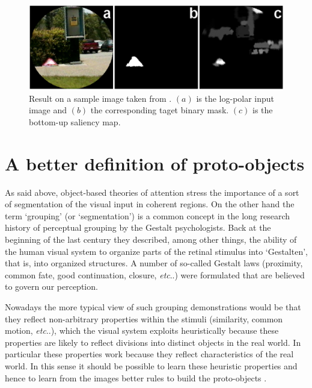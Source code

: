 \documentclass{llncs}
\makeatletter
\DeclareRobustCommand\onedot{\futurelet\@let@token\@onedot}
\def\@onedot{\ifx\@let@token.\else.\null\fi\xspace}
\def\etc{\emph{etc}\onedot} \def\vs{\emph{vs}\onedot}
\makeatother
\begin{document}
\begin{figure}[!h]
  \begin{center}
    \includegraphics[width=0.9\linewidth]{./figs/attention/itti_numbers}
    \caption{Result on a sample image taken from \cite{IttiK01b}.
     $(a)$ is the log-polar input image and $(b)$ the corresponding taget binary mask.
     $(c)$ is the bottom-up saliency map.}
    \label{fig:itti_ex}
  \end{center}
\end{figure}


\section{A better definition of proto-objects}
\label{sec:ass_fields}


As said above, object-based theories of attention stress the importance
of a sort of segmentation of the visual input in coherent regions.
On the other hand the term `grouping' (or `segmentation')
is a common concept in the long research history of perceptual grouping
by the Gestalt psychologists.
Back at the beginning of the last century they
described, among other things, the ability of the human
visual system to organize parts of the retinal stimulus
into `Gestalten', that is, into organized structures.
A number of so-called Gestalt laws 
(proximity, common fate, good continuation, closure, \etc) were
formulated that are believed to govern our perception.

Nowadays the more typical view of such grouping
demonstrations would be that they reflect non-arbitrary properties within the stimuli
(similarity, common motion, \etc), which the visual system
exploits heuristically because these properties
are likely to reflect divisions into distinct objects in the real world.
In particular these properties work because they reflect characteristics of
the real world. 
In this sense it should be possible to learn these heuristic
properties and hence to learn from the images better rules
to build the proto-objects \cite{PalmerR94}.
\end{document}
